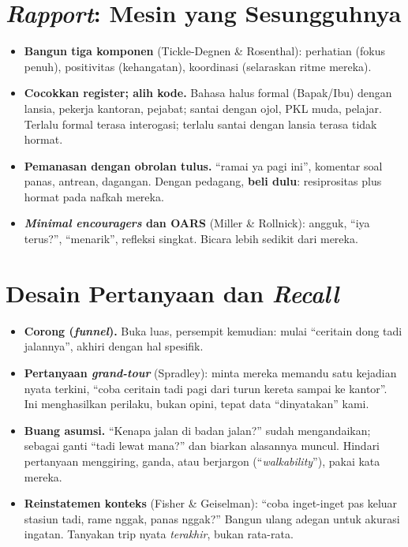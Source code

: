 \documentclass[11pt,a4paper]{report}
\begin{document}
\section{\emph{Rapport}: Mesin yang Sesungguhnya}
\begin{itemize}
  \item \textbf{Bangun tiga komponen} (Tickle-Degnen \& Rosenthal): perhatian (fokus
    penuh), positivitas (kehangatan), koordinasi (selaraskan ritme mereka).
  \item \textbf{Cocokkan register; alih kode.} Bahasa halus formal (Bapak/Ibu) dengan
    lansia, pekerja kantoran, pejabat; santai dengan ojol, PKL muda, pelajar. Terlalu
    formal terasa interogasi; terlalu santai dengan lansia terasa tidak hormat.
  \item \textbf{Pemanasan dengan obrolan tulus.} ``ramai ya pagi ini'', komentar soal
    panas, antrean, dagangan. Dengan pedagang, \textbf{beli dulu}: resiprositas plus
    hormat pada nafkah mereka.
  \item \textbf{\emph{Minimal encouragers} dan OARS} (Miller \& Rollnick): angguk, ``iya
    terus?'', ``menarik'', refleksi singkat. Bicara lebih sedikit dari mereka.
\end{itemize}

\section{Desain Pertanyaan dan \emph{Recall}}
\begin{itemize}
  \item \textbf{Corong (\emph{funnel}).} Buka luas, persempit kemudian: mulai ``ceritain
    dong tadi jalannya'', akhiri dengan hal spesifik.
  \item \textbf{Pertanyaan \emph{grand-tour}} (Spradley): minta mereka memandu satu
    kejadian nyata terkini, ``coba ceritain tadi pagi dari turun kereta sampai ke kantor''.
    Ini menghasilkan perilaku, bukan opini, tepat data ``dinyatakan'' kami.
  \item \textbf{Buang asumsi.} ``Kenapa jalan di badan jalan?'' sudah mengandaikan;
    sebagai ganti ``tadi lewat mana?'' dan biarkan alasannya muncul. Hindari pertanyaan
    menggiring, ganda, atau berjargon (``\emph{walkability}''), pakai kata mereka.
  \item \textbf{Reinstatemen konteks} (Fisher \& Geiselman): ``coba inget-inget pas keluar
    stasiun tadi, rame nggak, panas nggak?'' Bangun ulang adegan untuk akurasi ingatan.
    Tanyakan trip nyata \emph{terakhir}, bukan rata-rata.
\end{itemize}
\end{document}
